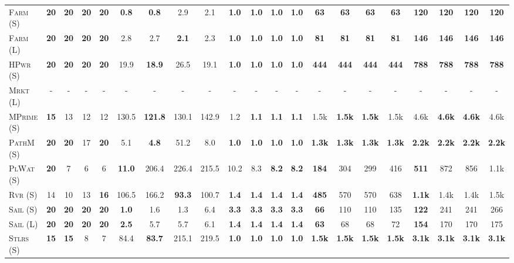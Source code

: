 \documentclass[11pt,landscape]{article}
\begin{document}
\begin{table*}[tb]
{\begin{tabular}{|l||cccc||cccc||cccc||cccc||cccc||}
\textsc{Farm} (S)&\textbf{20}&\textbf{20}&\textbf{20}&\textbf{20}&\textbf{0.8}&\textbf{0.8}&2.9&2.1&\textbf{1.0}&\textbf{1.0}&\textbf{1.0}&\textbf{1.0}&\textbf{63}&\textbf{63}&\textbf{63}&\textbf{63}&\textbf{120}&\textbf{120}&\textbf{120}&\textbf{120}\\
\textsc{Farm} (L)&\textbf{20}&\textbf{20}&\textbf{20}&\textbf{20}&2.8&2.7&\textbf{2.1}&2.3&\textbf{1.0}&\textbf{1.0}&\textbf{1.0}&\textbf{1.0}&\textbf{81}&\textbf{81}&\textbf{81}&\textbf{81}&\textbf{146}&\textbf{146}&\textbf{146}&\textbf{146}\\
\textsc{HPwr} (S)&\textbf{20}&\textbf{20}&\textbf{20}&\textbf{20}&19.9&\textbf{18.9}&26.5&19.1&\textbf{1.0}&\textbf{1.0}&\textbf{1.0}&\textbf{1.0}&\textbf{444}&\textbf{444}&\textbf{444}&\textbf{444}&\textbf{788}&\textbf{788}&\textbf{788}&\textbf{788}\\
\textsc{Mrkt} (L)&-&-&-&-&-&-&-&-&-&-&-&-&-&-&-&-&-&-&-&-\\
\textsc{MPrime} (S)&\textbf{15}&13&12&12&130.5&\textbf{121.8}&130.1&142.9&1.2&\textbf{1.1}&\textbf{1.1}&\textbf{1.1}&1.5k&\textbf{1.5k}&\textbf{1.5k}&1.5k&4.6k&\textbf{4.6k}&\textbf{4.6k}&4.6k\\
\textsc{PathM} (S)&\textbf{20}&\textbf{20}&17&\textbf{20}&5.1&\textbf{4.8}&51.2&8.0&\textbf{1.0}&\textbf{1.0}&\textbf{1.0}&\textbf{1.0}&\textbf{1.3k}&\textbf{1.3k}&\textbf{1.3k}&\textbf{1.3k}&\textbf{2.2k}&\textbf{2.2k}&\textbf{2.2k}&\textbf{2.2k}\\
\textsc{PlWat} (S)&\textbf{20}&7&6&6&\textbf{11.0}&206.4&226.4&215.5&10.2&8.3&\textbf{8.2}&\textbf{8.2}&\textbf{184}&304&299&416&\textbf{511}&872&856&1.1k\\
\textsc{Rvr} (S)&14&10&13&\textbf{16}&106.5&166.2&\textbf{93.3}&100.7&\textbf{1.4}&\textbf{1.4}&\textbf{1.4}&\textbf{1.4}&\textbf{485}&570&570&638&\textbf{1.1k}&1.4k&1.4k&1.5k\\
\textsc{Sail} (S)&\textbf{20}&\textbf{20}&\textbf{20}&\textbf{20}&\textbf{1.0}&1.6&1.3&6.4&\textbf{3.3}&\textbf{3.3}&\textbf{3.3}&\textbf{3.3}&\textbf{66}&110&110&135&\textbf{122}&241&241&266\\
\textsc{Sail} (L)&\textbf{20}&\textbf{20}&\textbf{20}&\textbf{20}&\textbf{2.5}&5.7&5.7&6.1&\textbf{1.4}&\textbf{1.4}&\textbf{1.4}&\textbf{1.4}&\textbf{63}&68&68&72&\textbf{154}&170&170&175\\
\textsc{Stlrs} (S)&\textbf{15}&\textbf{15}&8&7&84.4&\textbf{83.7}&215.1&219.5&\textbf{1.0}&\textbf{1.0}&\textbf{1.0}&\textbf{1.0}&\textbf{1.5k}&\textbf{1.5k}&\textbf{1.5k}&\textbf{1.5k}&\textbf{3.1k}&\textbf{3.1k}&\textbf{3.1k}&\textbf{3.1k}\\

\end{tabular}}
\end{table*}
\end{document}
